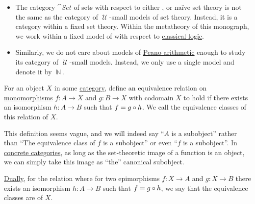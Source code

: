 \begin{example}
\begin{itemize}
    \item The category \hyperref[def:category_of_small_sets]{\( \cat{Set} \)} of sets with respect to either ,  or na\"ive set theory is not the same as the category of \( \mscrU \)-small models of set theory. Instead, it is a category within a fixed set theory. Within the metatheory of this monograph, we work within a fixed model of  with respect to \hyperref[def:classical_logic]{classical logic}.

    \item Similarly, we do not care about models of \hyperref[def:peano_arithmetic]{Peano arithmetic} enough to study its category of \( \mscrU \)-small models. Instead, we only use a single model and denote it by \( \BbbN \).
  \end{itemize}
\end{example}

\begin{definition}\label{def:subobject_and_quotient}
  For an object \( X \) in some \hyperref[def:category]{category}, define an equivalence relation on \hyperref[def:morphism_invertibility/left_cancellative]{monomorphisms} \( f: A \to X \) and \( g: B \to X \) with codomain \( X \) to hold if there exists an isomorphism \( h: A \to B \) such that \( f = g \bincirc h \). We call the equivalence classes of this relation  of \( X \).

  This definition seems vague, and we will indeed say \enquote{\( A \) is a subobject} rather than \enquote{The equivalence class of \( f \) is a subobject} or even \enquote{\( f \) is a subobject}. In \hyperref[rem:concrete_categories]{concrete categories}, as long as the set-theoretic image of a function is an object, we can simply take this image as \enquote{the} canonical subobject.

  \hyperref[thm:categorical_principle_of_duality]{Dually}, for the relation where for two epimorphisms \( f: X \to A \) and \( g: X \to B \) there exists an isomorphism \( h: A \to B \) such that \( f = g \bincirc h \), we say that the equivalence classes are  of \( X \).
\end{definition}

